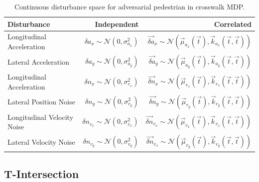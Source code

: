 \begin{table}
    \centering
    \caption{Continuous disturbance space for adversarial pedestrian in crosswalk MDP.}
    \label{tab:adversarial_ped_disturbance_space}
    \begin{tabular}{@{}lrr@{}} 
        \toprule
        \textbf{Disturbance} & \textbf{Independent} & \textbf{Correlated} \\
        \midrule
        Longitudinal Acceleration &  $\delta a_x \sim \mathcal{N}(0, \sigma_{a_x}^2)$ &  $\vec{\delta a}_x \sim \mathcal{N}(\vec{\mu}_{a_x}(\vec{t}), \vec{k}_{a_x}(\vec{t}, \vec{t}))$ \\
        Lateral Acceleration &  $ \delta a_y \sim \mathcal{N}(0, \sigma_{a_y}^2)$ &  $\vec{\delta a}_y \sim \mathcal{N}(\vec{\mu}_{a_y}(\vec{t}), \vec{k}_{a_y}(\vec{t}, \vec{t}))$ \\
        Longitudinal Acceleration &  $\delta n_x \sim \mathcal{N}(0, \sigma_{r_x}^2)$ &  $\vec{\delta n}_x \sim \mathcal{N}(\vec{\mu}_{r_x}(\vec{t}), \vec{k}_{r_x}(\vec{t}, \vec{t}))$ \\
        Lateral Position Noise &  $\delta n_y \sim \mathcal{N}(0, \sigma_{r_y}^2)$ &  $\vec{\delta n}_y \sim \mathcal{N}(\vec{\mu}_{r_y}(\vec{t}), \vec{k}_{r_y}(\vec{t}, \vec{t}))$ \\
        Longitudinal Velocity Noise &  $\delta n_{v_x} \sim \mathcal{N}(0, \sigma_{v_x}^2)$ &  $\vec{\delta n}_{v_x} \sim \mathcal{N}(\vec{\mu}_{v_x}(\vec{t}), \vec{k}_{v_x}(\vec{t}, \vec{t}))$ \\
        Lateral Velocity Noise &  $\delta n_{v_y} \sim \mathcal{N}(0, \sigma_{v_y}^2)$ &  $\vec{\delta n}_{v_x} \sim \mathcal{N}(\vec{\mu}_{v_y}(\vec{t}), \vec{k}_{v_y}(\vec{t}, \vec{t}))$ \\
        \bottomrule
    \end{tabular}
\end{table}
 



\subsection{T-Intersection}

